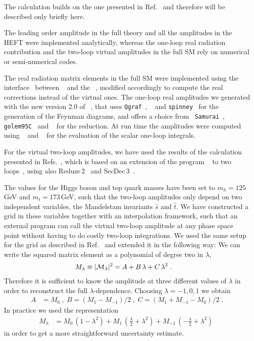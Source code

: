 The calculation builds on the one presented in Ref.~\cite{Heinrich:2017kxx} and therefore will be described only briefly here. 

The leading order amplitude in the full theory and  all the
amplitudes in the HEFT were implemented analytically, whereas the
one-loop real radiation contribution and the two-loop virtual
amplitudes in the full SM rely on numerical or semi-numerical
codes.

The real radiation matrix elements in the full SM were implemented
using the interface~\cite{Luisoni:2013cuh}
between \gosam~\cite{Cullen:2011ac,Cullen:2014yla} and
the \powhegbox~\cite{Nason:2004rx,Frixione:2007vw,Alioli:2010xd}, modified
accordingly to compute the real corrections instead of the virtual
ones. The one-loop real amplitudes we generated with the new version
2.0 of \gosam{}~\cite{Cullen:2014yla}, that
uses {\tt Qgraf}~\cite{Nogueira:1991ex}, \form~\cite{Kuipers:2012rf} and
{\tt spinney}~\cite{Cullen:2010jv} for the generation of the Feynman
diagrams, and offers a choice from {\tt
Samurai}~\cite{Mastrolia:2010nb,vanDeurzen:2013pja}, {\tt
golem95C}~\cite{Binoth:2008uq,Cullen:2011kv,Guillet:2013msa}
and \ninja{}~\cite{Peraro:2014cba} for the
reduction.  At run time the amplitudes were computed using
\ninja{}~\cite{Peraro:2014cba} and \avholo{}~\cite{vanHameren:2010cp}
for the evaluation of the scalar one-loop integrals.

For the virtual two-loop amplitudes, we have used the results of the
calculation presented in Refs.~\cite{Borowka:2016ehy,Borowka:2016ypz},
which is based on an extension of the program
\gosam{}~\cite{Cullen:2014yla} to two loops~\cite{Jones:2016bci},
using also {\sc Reduze}\,2~\cite{vonManteuffel:2012np} and {\sc
 SecDec}\,3~\cite{Borowka:2015mxa}.

The values for the Higgs boson and top quark masses have been set to
$m_h=125$\,GeV and $m_t=173$\,GeV, such that the two-loop amplitudes
only depend on two independent variables, the Mandelstam invariants
$\hat{s}$ and $\hat{t}$.  We have constructed a grid in these
variables together with an interpolation framework, such that an
external program can call the virtual two-loop amplitude at any phase space
point without having to do costly two-loop integrations.
We used the same setup for the grid as described in Ref.~\cite{Heinrich:2017kxx} and extended it in the following way:
We can write the squared matrix element as a polynomial of degree two in $\lambda$, 
\begin{align}
M_\lambda& \equiv |{\cal M}_\lambda|^2=A+B\,\lambda + C\,\lambda^2\;.
\end{align}
Therefore it is sufficient to know the amplitude at three different values of $\lambda$ in order to reconstruct the full $\lambda$-dependence. 
Choosing $\lambda=-1,0,1$ we obtain
\begin{align}
A&=M_0\;,\; B=(M_1-M_{-1})/2\;,\; C=(M_1+M_{-1}-M_0)/2\;.
\end{align}
In practice we used the representation 
\begin{align}
M_\lambda &=M_0\,(1-\lambda^2)+M_1\,(\frac{\lambda}{2}+\lambda^2) + M_{-1}\,(-\frac{\lambda}{2}+\lambda^2)\;
\end{align}
in order to get a more straightforward uncertainty estimate.

